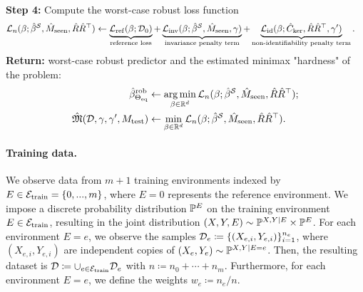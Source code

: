 \begin{algorithm}[h!]
\begin{algorithmic}[1]
    \State {}\textbf{Step 4:} Compute the worst-case robust loss function 
    \begin{align*}
        \mathcal{L}_n(\beta; \hat{\beta}^{\mathcal{S}}, \hat{M}_{\mathrm{seen}}, \hat{R}\hat{R}^\top) &\gets \underbrace{\mathcal{L}_{\mathrm{ref}}(\beta; \mathcal{D}_0)}_{\text{reference loss}} + \underbrace{\mathcal{L}_{\mathrm{inv}}(\beta; \hat{\beta}^{\mathcal{S}}, \hat{M}_{\mathrm{seen}}, \gamma)}_{\text{invariance penalty term}} + \underbrace{\mathcal{L}_{\mathrm{id}}(\beta; \hat{C}_{\mathrm{ker}}, \hat{R} \hat{R}^\top, \gamma')}_{\text{non-identifiability penalty term}}.
    \end{align*}
    \State \textbf{Return:}  worst-case robust predictor and the estimated minimax "hardness" of the problem: 
    \begin{align*}
        \hat{\beta}^{\mathrm{rob}}_{\Theta_{\mathrm{eq}}} &\gets \operatorname*{arg\,min}_{\beta \in \mathbb{R}^d} \mathcal{L}_n(\beta; \hat{\beta}^{\mathcal{S}}, \hat{M}_{\mathrm{seen}}, \hat{R}\hat{R}^\top); \\ 
       \hat{\mathfrak{M}}(\mathcal{D},\gamma, \gamma', M_{\mathrm{test}}) &\gets \min_{\beta \in \mathbb{R}^d} \mathcal{L}_n(\beta; \hat{\beta}^{\mathcal{S}}, \hat{M}_{\mathrm{seen}}, \hat{R}\hat{R}^\top).
    \end{align*}
    
        
    \end{algorithmic}
\end{algorithm}


\paragraph{Training data.} We observe data from $m + 1$ training environments indexed by $E \in \mathcal{E}_{\mathrm{train}} = \{0,..., m\}$, where $E = 0$ represents the reference environment. We impose a discrete probability distribution $\mathbb{P}^{E}$ on the training environment $E \in \mathcal{E}_{\mathrm{train}}$, resulting in the joint distribution $(X, Y, E) \sim \mathbb{P}^{X, Y \mid E} \times \mathbb{P}^{E}$.  For each environment $E = e$, we observe the samples $\mathcal{D}_e \coloneqq \{(X_{e,i}, Y_{e,i})\}_{i = 1}^{n_e}$, where $(X_{e, i}, Y_{e, i})$ are independent copies of $(X_e, Y_e) \sim \mathbb{P}^{X, Y \mid E = e}$. Then, the resulting dataset is $\mathcal{D} \coloneqq \cup_{e \in \mathcal{E}_{\mathrm{train}}} \mathcal{D}_e$ with $n \coloneqq n_0 + \cdots + n_m$. Furthermore, for each environment $E = e$, we define the weights $w_e \coloneqq n_e / n$. 

